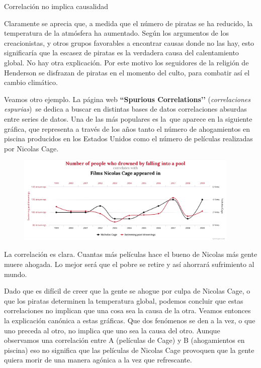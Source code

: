 \begin{myexampleblock}{Correlación no implica causalidad}
\begin{small}
Claramente se aprecia que, a medida que el número de piratas se ha reducido, la temperatura de la atmósfera ha aumentado. Según los argumentos de los creacionistas, y otros grupos favorables a encontrar causas donde no las hay, esto significaría que la escasez de piratas es la verdadera causa del calentamiento global. No hay otra explicación. Por este motivo los seguidores de la religión de Henderson se disfrazan de piratas en el momento del culto, para combatir así el cambio climático.

\vspace{2mm} Veamos otro ejemplo. La página web \textbf{``Spurious Correlations’’} (\emph{correlaciones espurias}) se dedica a buscar en distintas bases de datos correlaciones absurdas entre series de datos. Una de las más populares es la que aparece en la siguiente gráfica, que representa a través de los años tanto el número de ahogamientos en piscina producidos en los Estados Unidos como el número de películas realizadas por Nicolas Cage.

	\begin{figure}[H]
			\centering
			\includegraphics[width=0.95\textwidth]{imagenes/imagenes03/T03IM24.png}
	\end{figure}

La correlación es clara. Cuantas más películas hace el bueno de Nicolas más gente muere ahogada. Lo mejor será que el pobre se retire y así ahorrará sufrimiento al mundo.

\vspace{2mm} Dado que es difícil de creer que la gente se ahogue por culpa de Nicolas Cage, o que los piratas determinen la temperatura global, podemos concluir que estas correlaciones no implican que una cosa sea la causa de la otra. Veamos entonces la explicación canónica a estas gráficas. Que dos fenómenos se den a la vez, o que uno preceda al otro, no implica que uno sea la causa del otro. Aunque observamos una correlación entre A (películas de Cage) y B (ahogamientos en piscina) eso no significa que las películas de Nicolas Cage provoquen que la gente quiera morir de una manera agónica a la vez que refrescante.


\end{small}
\end{myexampleblock}
